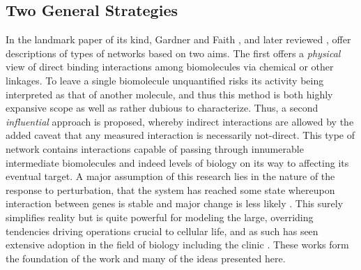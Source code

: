 \subsection{Two General Strategies}
\label{sec:purpose}
In the landmark paper of its kind, Gardner and Faith \citep{gardner2005reverse}, and later reviewed \citep{HECKER200986}, offer descriptions of types of networks based on two aims. The first offers a \emph{physical} view of direct binding interactions among biomolecules via chemical or other linkages. To leave a single biomolecule unquantified risks its activity being interpreted as that of another molecule, and thus this method is both highly expansive scope as well as rather dubious to characterize. Thus, a second \emph{influential} approach is proposed, whereby indirect interactions are allowed by the added caveat that any measured interaction is necessarily not-direct. This type of network contains interactions capable of passing through innumerable intermediate biomolecules and indeed levels of biology on its way to affecting its eventual target. A major assumption of this research lies in the nature of the response to perturbation, \ie that the system has reached some state whereupon interaction between genes is stable and major change is less likely \citep{gardner2003inferring, gardner2005reverse,tegner2003reverse}. This surely simplifies reality but is quite powerful for modeling the large, overriding tendencies driving operations crucial to cellular life, and as such has seen extensive adoption in the field of biology including the clinic \citep{kusko2016integrated}.  These works form the foundation of the work and many of the ideas presented here. 



